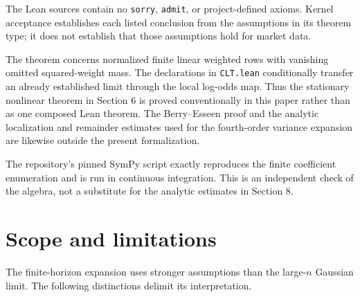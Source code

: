 \documentclass[11pt]{article}
\begin{document}
The Lean sources contain no \texttt{sorry}, \texttt{admit}, or project-defined
axioms.  Kernel acceptance establishes each listed conclusion from the
assumptions in its theorem type; it does not establish that those assumptions
hold for market data.

The theorem  concerns normalized finite
linear weighted rows with vanishing omitted squared-weight mass.  The
declarations in \texttt{CLT.lean} conditionally transfer an already established
limit through the local log-odds map.  Thus the stationary nonlinear theorem
in Section 6 is proved conventionally in this paper rather than as one composed
Lean theorem.  The Berry--Esseen proof and the analytic localization and
remainder estimates used for the fourth-order variance expansion are likewise
outside the present formalization.

The repository's pinned SymPy script exactly reproduces the finite coefficient
enumeration and is run in continuous integration.  This is an independent
check of the algebra, not a substitute for the analytic estimates in Section 8.

\section{Scope and limitations}
The finite-horizon expansion uses stronger assumptions than the large-$n$
Gaussian limit.  The following distinctions delimit its interpretation.
\end{document}
